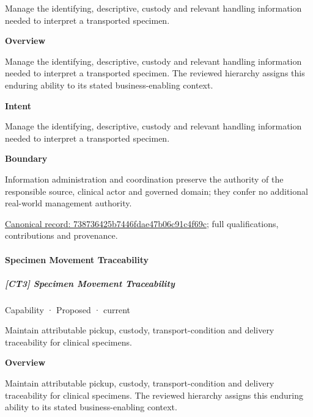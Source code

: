 Manage the identifying, descriptive, custody and relevant handling information needed to interpret a transported specimen.



\textbf{Overview}



Manage the identifying, descriptive, custody and relevant handling information needed to interpret a transported specimen. The reviewed hierarchy assigns this enduring ability to its stated business-enabling context.



\textbf{Intent}



Manage the identifying, descriptive, custody and relevant handling information needed to interpret a transported specimen.



\textbf{Boundary}



Information administration and coordination preserve the authority of the responsible source, clinical actor and governed domain; they confer no additional real-world management authority.


{\footnotesize \href{../../../../continuum/strategy/capability/738736425b7446fdae47b06c91c4f69c.md}{Canonical record: 738736425b7446fdae47b06c91c4f69c}; full qualifications, contributions and provenance.}\par
\paragraph{Specimen Movement Traceability}

\subparagraph{[CT3] Specimen Movement Traceability}

\label{element:bfa2e9a84ddd4287897573dc0d917a00}
{\small Capability · Proposed · current}\par

Maintain attributable pickup, custody, transport-condition and delivery traceability for clinical specimens.



\textbf{Overview}



Maintain attributable pickup, custody, transport-condition and delivery traceability for clinical specimens. The reviewed hierarchy assigns this enduring ability to its stated business-enabling context.



